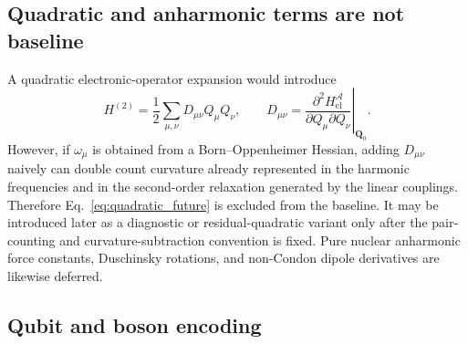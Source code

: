 \documentclass[
  reprint,
  amsmath,
  amssymb,
  aps,
  pra,
  nofootinbib,
  superscriptaddress,
  floatfix
]{revtex4-2}
\newcommand{\Acal}{\mathcal{A}}
\newcommand{\el}{\mathrm{el}}
\begin{document}
\subsection{Quadratic and anharmonic terms are not baseline}

A quadratic electronic-operator expansion would introduce
\begin{equation}
H^{(2)}
=
\frac12
\sum_{\mu,\nu}
D_{\mu\nu}Q_\mu Q_\nu,
\qquad
D_{\mu\nu}
=
\left.
\frac{\partial^2H_{\el}^{\Acal}}
{\partial Q_\mu\partial Q_\nu}
\right|_{\mathbf Q_0}.
\label{eq:quadratic_future}
\end{equation}
However, if \(\omega_\mu\) is obtained from a Born--Oppenheimer Hessian, adding \(D_{\mu\nu}\) naively can double count curvature already represented in the harmonic frequencies and in the second-order relaxation generated by the linear couplings.  Therefore Eq.~\eqref{eq:quadratic_future} is excluded from the baseline.  It may be introduced later as a diagnostic or residual-quadratic variant only after the pair-counting and curvature-subtraction convention is fixed.  Pure nuclear anharmonic force constants, Duschinsky rotations, and non-Condon dipole derivatives are likewise deferred.

\subsection{Qubit and boson encoding}
\end{document}
